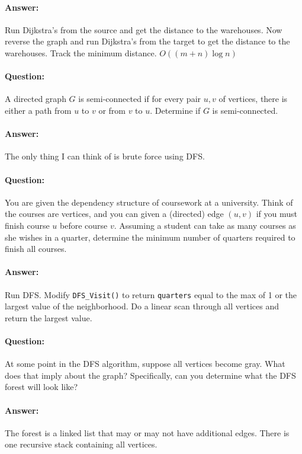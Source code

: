 \documentclass{article}
\newcommand{\code}[1]{\texttt{#1}}
\begin{document}
\paragraph{Answer:} Run Dijkstra's from the source and get the distance to the warehouses. Now reverse the graph and run Dijkstra's from the target to get the distance to the warehouses. Track the minimum distance. \(O((m+n)\log n)\)

\paragraph{Question:} A directed graph \(G\) is semi-connected if for every pair \(u, v\) of vertices, there is either a path from \(u\) to \(v\) or from \(v\) to \(u\). Determine if \(G\) is semi-connected.

\paragraph{Answer:} The only thing I can think of is brute force using DFS.

\paragraph{Question:} You are given the dependency structure of coursework at a university. Think of the courses are vertices, and you can given a (directed) edge \((u, v)\) if you must finish course \(u\) before course \(v\). Assuming a student can take as many courses as she wishes in a quarter, determine the minimum number of quarters required to finish all courses.

\paragraph{Answer:} Run DFS. Modify \code{DFS\_Visit()} to return \code{quarters} equal to the max of 1 or the largest value of the neighborhood. Do a linear scan through all vertices and return the largest value.

\paragraph{Question:} At some point in the DFS algorithm, suppose all vertices become gray. What does that imply about the graph? Specifically, can you determine what the DFS forest will look like?

\paragraph{Answer:} The forest is a linked list that may or may not have additional edges. There is one recursive stack containing all vertices.
\end{document}
